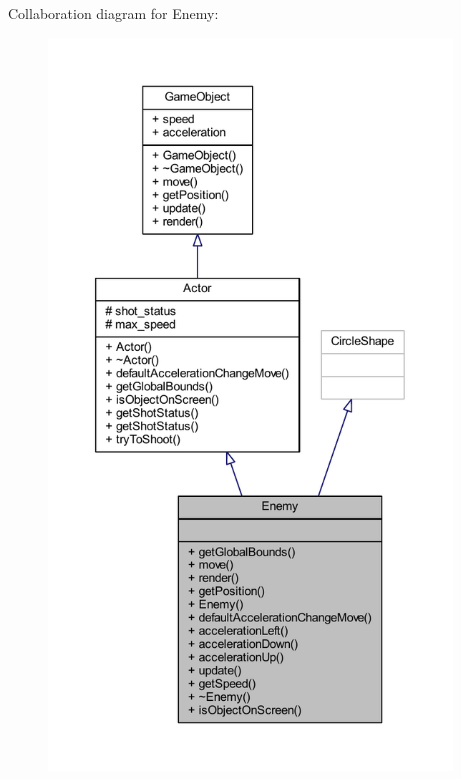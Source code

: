 Collaboration diagram for Enemy\+:\nopagebreak
\begin{figure}[H]
\begin{center}
\leavevmode
\includegraphics[height=550pt]{class_enemy__coll__graph}
\end{center}
\end{figure}
